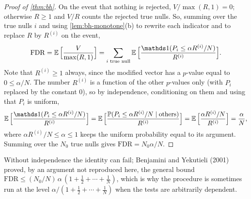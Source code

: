 \begin{proof}[Proof of \cref{thm:bh}]
On the event that nothing is rejected, $V/\max(R,1) = 0$; otherwise $R \geq 1$ and $V/R$ counts the rejected true nulls.
So, summing over the true nulls $i$ and using \cref{lem:bh-monotone}(b) to rewrite each indicator and to replace $R$ by $R^{(i)}$ on the event,
\[
\mathrm{FDR} = \E\Big[\frac{V}{\max(R,1)}\Big] = \sum_{i \text{ true null}} \E\Big[\frac{\ind(P_i \leq \alpha R^{(i)}/N)}{R^{(i)}}\Big].
\]
Note that $R^{(i)} \geq 1$ always, since the modified vector has a $p$-value equal to $0 \leq \alpha/N$.
The number $R^{(i)}$ is a function of the other $p$-values only (with $P_i$ replaced by the constant $0$), so by independence, conditioning on them and using that $P_i$ is uniform,
\[
\E\Big[\frac{\ind(P_i \leq \alpha R^{(i)}/N)}{R^{(i)}}\Big] = \E\Big[\frac{\Pr(P_i \leq \alpha R^{(i)}/N \mid \text{others})}{R^{(i)}}\Big] = \E\Big[\frac{\alpha R^{(i)}/N}{R^{(i)}}\Big] = \frac{\alpha}{N},
\]
where $\alpha R^{(i)}/N \leq \alpha \leq 1$ keeps the uniform probability equal to its argument.
Summing over the $N_0$ true nulls gives $\mathrm{FDR} = N_0\alpha/N$.
\end{proof}

Without independence the identity can fail; Benjamini and Yekutieli (2001) proved, by an argument not reproduced here, the general bound $\mathrm{FDR} \leq (N_0/N)\,\alpha\,(1 + \frac12 + \cdots + \frac1N)$, which is why the procedure is sometimes run at the level $\alpha/(1 + \frac12 + \cdots + \frac1N)$ when the tests are arbitrarily dependent.
